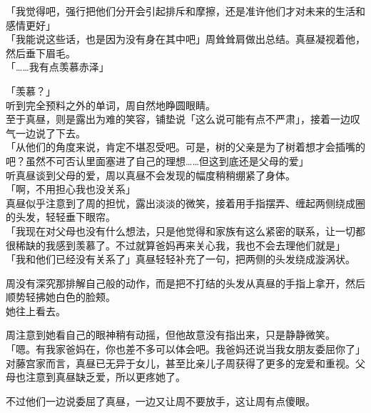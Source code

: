 「我觉得吧，强行把他们分开会引起排斥和摩擦，还是准许他们才对未来的生活和感情更好」\\

「我能说这些话，也是因为没有身在其中吧」周耸耸肩做出总结。真昼凝视着他，然后垂下眉毛。\\

「……我有点羡慕赤泽」

「羡慕？」\\

听到完全预料之外的单词，周自然地睁圆眼睛。\\

至于真昼，则是露出为难的笑容，铺垫说「这么说可能有点不严肃」，接着一边叹气一边说了下去。\\

「从他们的角度来说，肯定不堪忍受吧。可是，树的父亲是为了树着想才会插嘴的吧？虽然不可否认里面塞进了自己的理想……但这到底还是父母的爱」\\

听真昼谈到父母的爱，周以真昼不会发现的幅度稍稍绷紧了身体。\\

「啊，不用担心我也没关系」\\

真昼似乎注意到了周的担忧，露出淡淡的微笑，接着用手指摆弄、缠起两侧绕成圈的头发，轻轻垂下眼帘。\\

「我现在对父母也没有什么想法，只是他觉得和家族有这么紧密的联系，让一切都很稀缺的我感到羡慕了。不过就算爸妈再来关心我，我也不会去理他们就是」\\

「我和他们已经没有关系了」真昼轻轻补充了一句，把两侧的头发绕成漩涡状。

周没有深究那排解自己般的动作，而是把不打结的头发从真昼的手指上拿开，然后顺势轻拂她白色的脸颊。\\

她往上看去。

周注意到她看自己的眼神稍有动摇，但他故意没有指出来，只是静静微笑。\\

「嗯。有我家爸妈在，你也差不多可以体会吧。我爸妈还说当我女朋友委屈你了」\\

对藤宫家而言，真昼已无异于女儿，甚至比亲儿子周获得了更多的宠爱和重视。父母也注意到真昼缺乏爱，所以更疼她了。

不过他们一边说委屈了真昼，一边又让周不要放手，这让周有点傻眼。\\

